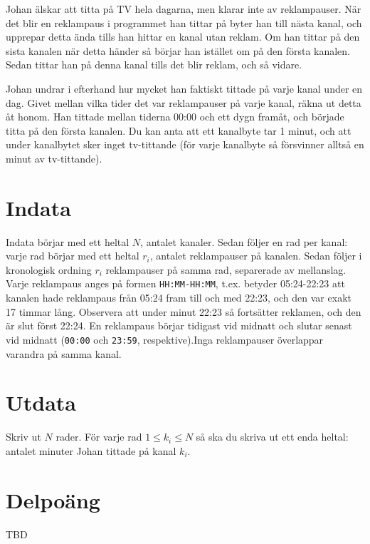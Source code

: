 
Johan älskar att titta på TV hela dagarna, men klarar inte av reklampauser. När det blir en reklampaus i programmet han tittar på byter han till nästa kanal, och upprepar detta ända tills han hittar en kanal utan reklam. Om han tittar på den sista kanalen när detta händer så börjar han istället om på den första kanalen. Sedan tittar han på denna kanal tills det blir reklam, och så vidare.

Johan undrar i efterhand hur mycket han faktiskt tittade på varje kanal under en dag. Givet mellan vilka tider det var reklampauser på varje kanal, räkna ut detta åt honom. Han tittade mellan tiderna 00:00 och ett dygn framåt, och började titta på den första kanalen. Du kan anta att ett kanalbyte tar 1 minut, och att under kanalbytet sker inget tv-tittande (för varje kanalbyte så försvinner alltså en minut av tv-tittande).

\section*{Indata}
Indata börjar med ett heltal $N$, antalet kanaler. Sedan följer en rad per kanal: varje rad börjar med ett heltal $r_i$, antalet reklampauser på kanalen. Sedan följer i kronologisk ordning $r_i$ reklampauser på samma rad, separerade av mellanslag. Varje reklampaus anges på formen \texttt{HH:MM-HH:MM}, t.ex. betyder 05:24-22:23 att kanalen hade reklampaus från 05:24 fram till och med 22:23, och den var exakt 17 timmar lång. Observera att under minut 22:23 så fortsätter reklamen, och den är slut först 22:24. En reklampaus börjar tidigast vid midnatt och slutar senast vid midnatt (\texttt{00:00} och \texttt{23:59}, respektive).Inga reklampauser överlappar varandra på samma kanal.

\section*{Utdata}
Skriv ut $N$ rader. För varje rad $1 \leq k_i \leq N$ så ska du skriva ut ett enda heltal: antalet minuter Johan tittade på kanal $k_i$.

\section*{Delpoäng}
TBD
